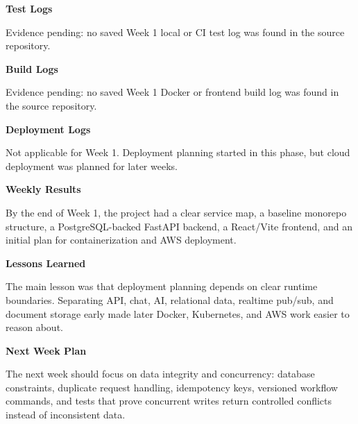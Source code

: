\vspace{0.5em}\noindent\textbf{Test Logs}\par

Evidence pending: no saved Week 1 local or CI test log was found in the
source repository.

\vspace{0.5em}\noindent\textbf{Build Logs}\par

Evidence pending: no saved Week 1 Docker or frontend build log was found
in the source repository.

\vspace{0.5em}\noindent\textbf{Deployment Logs}\par

Not applicable for Week 1. Deployment planning started in this phase,
but cloud deployment was planned for later weeks.

\vspace{0.5em}\noindent\textbf{Weekly Results}\par

By the end of Week 1, the project had a clear service map, a baseline
monorepo structure, a PostgreSQL-backed FastAPI backend, a React/Vite
frontend, and an initial plan for containerization and AWS deployment.

\vspace{0.5em}\noindent\textbf{Lessons Learned}\par

The main lesson was that deployment planning depends on clear runtime
boundaries. Separating API, chat, AI, relational data, realtime pub/sub,
and document storage early made later Docker, Kubernetes, and AWS work
easier to reason about.

\vspace{0.5em}\noindent\textbf{Next Week Plan}\par

The next week should focus on data integrity and concurrency: database
constraints, duplicate request handling, idempotency keys, versioned
workflow commands, and tests that prove concurrent writes return
controlled conflicts instead of inconsistent data.
